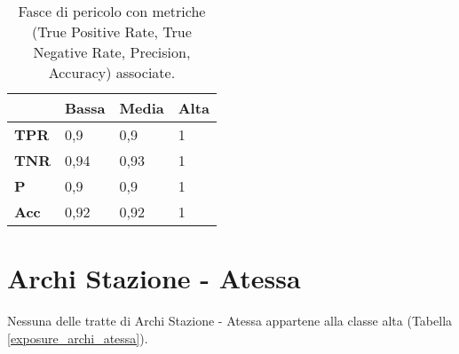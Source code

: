 \begin{table}[h]
	\centering
	\renewcommand{\arraystretch}{1.2}
	\begin{tabular}{|C{3cm}|C{3cm}|C{3cm}|C{3cm}|}
		\hline
		 & Bassa & Media & Alta \\ \hline
		\textbf{TPR}                                   & 0,9                                                           & 0,9                                                           & 1                                                          \\ \hline
		\textbf{TNR}                                   & 0,94                                                           & 0,93                                                           & 1                                                          \\ \hline
		\textbf{P}                                     & 0,9                                                           & 0,9                                                           & 1                                                          \\ \hline
		\textbf{Acc}                                   & 0,92                                                           & 0,92                                                           & 1                                                          \\ \hline
	\end{tabular}
	\caption{ Fasce di pericolo con metriche (True Positive Rate, True Negative Rate, Precision, Accuracy) associate.}
	\label{tab:RisultatiMetricheRoute}
	\end{table}

\section{Archi Stazione - Atessa}
Nessuna delle tratte di Archi Stazione - Atessa appartene alla classe alta (Tabella \ref{exposure_archi_atessa}).

